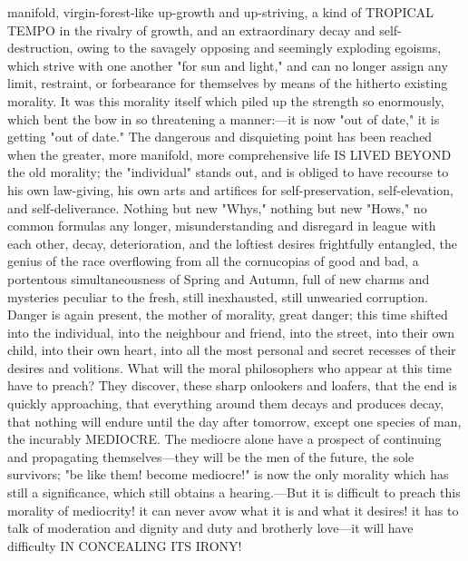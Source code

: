 \documentclass[12pt]{article}
\begin{document}
manifold, virgin-forest-like up-growth and up-striving, a kind of TROPICAL TEMPO in the rivalry of growth, and an extraordinary decay and self-destruction, owing to the savagely opposing and seemingly exploding egoisms, which strive with one another "for sun and light," and can no longer assign any limit, restraint, or forbearance for themselves by means of the hitherto existing morality. It was this morality itself which piled up the strength so enormously, which bent the bow in so threatening a manner:---it is now "out of date," it is getting "out of date." The dangerous and disquieting point has been reached when the greater, more manifold, more comprehensive life IS LIVED BEYOND the old morality; the "individual" stands out, and is obliged to have recourse to his own law-giving, his own arts and artifices for self-preservation, self-elevation, and self-deliverance. Nothing but new "Whys," nothing but new "Hows," no common formulas any longer, misunderstanding and disregard in league with each other, decay, deterioration, and the loftiest desires frightfully entangled, the genius of the race overflowing from all the cornucopias of good and bad, a portentous simultaneousness of Spring and Autumn, full of new charms and mysteries peculiar to the fresh, still inexhausted, still unwearied corruption. Danger is again present, the mother of morality, great danger; this time shifted into the individual, into the neighbour and friend, into the street, into their own child, into their own heart, into all the most personal and secret recesses of their desires and volitions. What will the moral philosophers who appear at this time have to preach? They discover, these sharp onlookers and loafers, that the end is quickly approaching, that everything around them decays and produces decay, that nothing will endure until the day after tomorrow, except one species of man, the incurably MEDIOCRE. The mediocre alone have a prospect of continuing and propagating themselves---they will be the men of the future, the sole survivors; "be like them! become mediocre!" is now the only morality which has still a significance, which still obtains a hearing.---But it is difficult to preach this morality of mediocrity! it can never avow what it is and what it desires! it has to talk of moderation and dignity and duty and brotherly love---it will have difficulty IN CONCEALING ITS IRONY!
\end{document}
